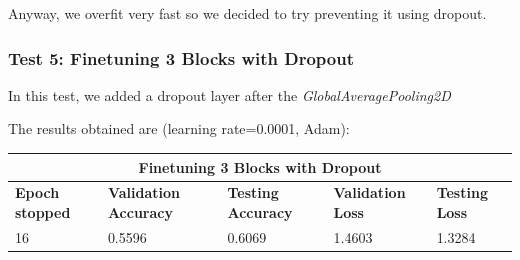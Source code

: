 Anyway, we overfit very fast so we decided to try preventing it using dropout.


\subsubsection{Test 5: Finetuning 3 Blocks with Dropout}
In this test, we added a dropout layer after the \textit{GlobalAveragePooling2D}

\noindent The results obtained are (learning rate=0.0001, Adam):

\medskip
\begin{tabular}{ |p{2cm}|p{2cm}|p{2cm}|p{2cm}|p{2cm}|  }
\hline
\multicolumn{5}{|c|}{Finetuning 3 Blocks with Dropout} \\
\hline
\textbf{Epoch stopped} & \textbf{Validation Accuracy} & \textbf{Testing Accuracy} & \textbf{Validation Loss} & \textbf{Testing Loss} \\
\hline
16 & 0.5596 & 0.6069 & 1.4603 & 1.3284\\
\hline
\end{tabular}

